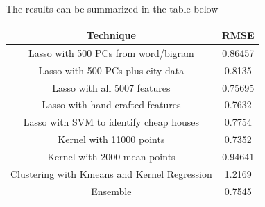 \documentclass[a4paper,10pt]{article}
\begin{document}
The results can be summarized in the table below
\begin{center}

\begin{tabular}{|c | c|}
\hline
 Technique & RMSE \\ \hline
Lasso with 500 PCs from word/bigram & 0.86457 \\ \hline
Lasso with 500 PCs plus city data & 0.8135 \\ \hline
Lasso with all 5007 features & 0.75695 \\ \hline
Lasso with hand-crafted features & 0.7632 \\ \hline
Lasso with SVM to identify cheap houses & 0.7754 \\ \hline
Kernel with 11000 points & 0.7352 \\ \hline
Kernel with 2000 mean points & 0.94641 \\ \hline
Clustering with Kmeans and Kernel Regression & 1.2169\\ \hline
Ensemble & 0.7545 \\ \hline

\end{tabular}
 
\end{center}
\end{document}
